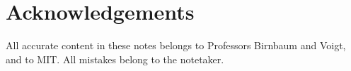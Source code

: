 \section*{Acknowledgements}

All accurate content in these notes belongs to Professors Birnbaum and Voigt, and to MIT.
All mistakes belong to the notetaker. 
